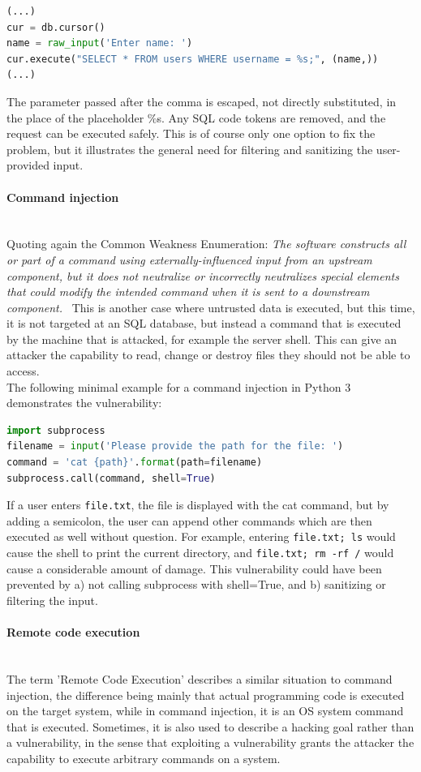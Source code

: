 \documentclass[
	a4paper,
	pagesize,
	pdftex,
	12pt,
	twoside, %
	BCOR=5mm, %
	ngerman,
	fleqn,
	final,
	]{scrartcl}
\begin{document}
\begin{lstlisting}[language=Python,showstringspaces=false]
(...)
cur = db.cursor()
name = raw_input('Enter name: ')
cur.execute("SELECT * FROM users WHERE username = %s;", (name,))
(...)
\end{lstlisting}
The parameter passed after the comma is escaped, not directly substituted, in the place of the placeholder \%s. Any SQL code tokens are removed, and the request can be executed safely. This is of course only one option to fix the problem, but it illustrates the general need for filtering and sanitizing the user-provided input. 

\paragraph{Command injection}\mbox{}\\
Quoting again the Common Weakness Enumeration: \textit{The software constructs all or part of a command using externally-influenced input from an upstream component, but it does not neutralize or incorrectly neutralizes special elements that could modify the intended command when it is sent to a downstream component.}~\cite{CommonWeaknessEnumeration.23.9.2019} This is another case where untrusted data is executed, but this time, it is not targeted at an SQL database, but instead a command that is executed by the machine that is attacked, for example the server shell. This can give an attacker the capability to read, change or destroy files they should not be able to access. \\
The following minimal example for a command injection in Python 3 demonstrates the vulnerability:
\begin{lstlisting}[language=Python,showstringspaces=false]
import subprocess
filename = input('Please provide the path for the file: ')
command = 'cat {path}'.format(path=filename)
subprocess.call(command, shell=True)
\end{lstlisting}
If a user enters \texttt{file.txt}, the file is displayed with the cat command, but by adding a semicolon, the user can append other commands which are then executed as well without question. For example, entering \texttt{file.txt; ls} would cause the shell to print the current directory, and \texttt{file.txt; rm -rf /} would cause a considerable amount of damage. This vulnerability could have been prevented by a) not calling subprocess with shell=True, and b) sanitizing or filtering the input. 

\paragraph{Remote code execution}\mbox{}\\
The term 'Remote Code Execution' describes a similar situation to command injection, the difference being mainly that actual programming code is executed on the target system, while in command injection, it is an OS system command that is executed. Sometimes, it is also used to describe a hacking goal rather than a vulnerability, in the sense that exploiting a vulnerability grants the attacker the capability to execute arbitrary commands on a system. 
\end{document}
